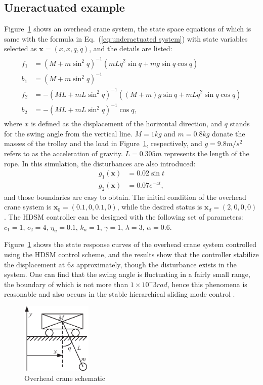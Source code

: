 \documentclass[3p]{elsarticle}
\theoremstyle{plain}
\theoremstyle{remark}
\begin{document}
\subsection{Uneractuated example}
Figure~\ref{Figure:8} shows an overhead crane system, the state space equations of which is same with the formula in Eq.~(\ref{eq:underactuated system}) with state variables selected as $\bm x=(x,\dot x,q,\dot q)$, and the details are listed:
\begin{align}
\begin{split}
f_1&=(M+m\sin^2q)^{-1}(mL\dot q^2\sin q+mg\sin q\cos q)\\
b_1&=(M+m\sin^2q)^{-1}\\
f_2&=-(ML+mL\sin^2q)^{-1}((M+m)g\sin q+mL\dot q^2\sin q\cos q)\\
b_2&=-(ML+mL\sin^2q)^{-1}\cos q,
\end{split}
\end{align}
where $x$ is defined as the displacement of the horizontal direction, and $q$ stands for the swing angle from the vertical line. $M=1kg$ and $m=0.8kg$ donate the masses of the trolley and the load in Figure~\ref{Figure:8}, respectively, and $g=9.8m/s^2$ refers to as the acceleration of gravity. $L=0.305m$ represents the length of the rope. In this simulation, the disturbances are also introduced:
\begin{align} 
g_1(\bm x)&= 0.02\sin t\\
g_2(\bm x)&=0.07e^{-4t},
\end{align}
and those boundaries are easy to obtain. The initial condition of the overhead crane system is $\bm x_0 = (0.1,0,0.1,0)$, while the desired status is $\bm x_d = (2,0,0,0)$. The HDSM controller can be designed with the following set of parameters:
$c_1=1$, $c_2=4$, $\eta_u = 0.1$, $k_u=1$, $\gamma = 1$, $\lambda = 3$, $\alpha = 0.6$.\par
Figure~\ref{Figure:8} shows the state response curves of the overhead crane system controlled using the HDSM control scheme, and the results show that the controller stabilize the displacement at $6s$ approximately, though the disturbance exists in the system. One can find that the swing angle is fluctuating in a fairly small range, the boundary of which is not more than $1\times 10^-3rad$, hence this phenomena is reasonable and also occurs in the stable hierarchical sliding mode control \cite{wang2004design}.  
\begin{figure}
\centering
\includegraphics[width=0.3\textwidth]{paper3_fig8.eps}
\caption{Overhead crane schematic}
\label{Figure:8}
\end{figure}
\end{document}
